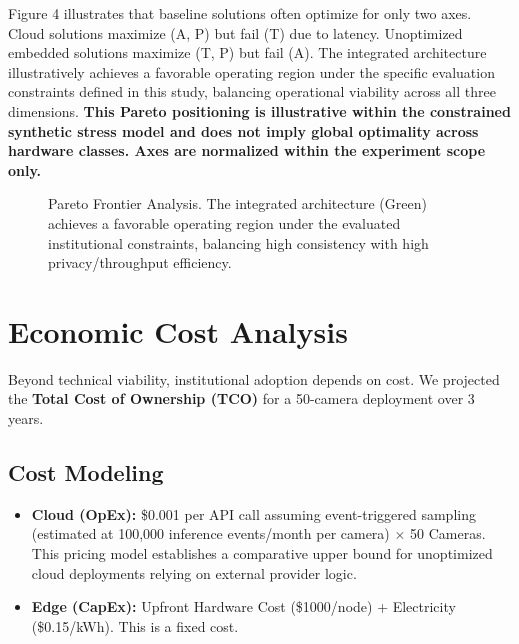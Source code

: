 \documentclass[conference]{IEEEtran}
\begin{document}
Figure 4 illustrates that baseline solutions often optimize for only two axes. Cloud solutions maximize (A, P) but fail (T) due to latency. Unoptimized embedded solutions maximize (T, P) but fail (A). The integrated architecture illustratively achieves a favorable operating region under the specific evaluation constraints defined in this study, balancing operational viability across all three dimensions. \textbf{This Pareto positioning is illustrative within the constrained synthetic stress model and does not imply global optimality across hardware classes. Axes are normalized within the experiment scope only.} 

\begin{figure}[htbp]
\centering
{}
\caption{Pareto Frontier Analysis. The integrated architecture (Green) achieves a favorable operating region under the evaluated institutional constraints, balancing high consistency with high privacy/throughput efficiency.}
\label{fig:pareto}
\end{figure}

\section{Economic Cost Analysis}
Beyond technical viability, institutional adoption depends on cost. We projected the \textbf{Total Cost of Ownership (TCO)} for a 50-camera deployment over 3 years. 

\subsection{Cost Modeling}
\begin{itemize}
    \item \textbf{Cloud (OpEx):} \$0.001 per API call assuming event-triggered sampling (estimated at 100,000 inference events/month per camera) $\times$ 50 Cameras. This pricing model establishes a comparative upper bound for unoptimized cloud deployments relying on external provider logic. 
    \item \textbf{Edge (CapEx):} Upfront Hardware Cost (\$1000/node) + Electricity (\$0.15/kWh). This is a fixed cost.
\end{itemize}
\end{document}
